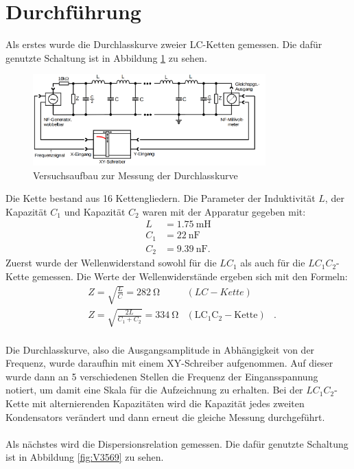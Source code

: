 \documentclass[
  bibliography=totoc,     %
  captions=tableheading,  %
  titlepage=firstiscover, %
]{scrartcl}
\begin{document}
\section{Durchführung}
\label{durchführung}
Als erstes wurde die Durchlasskurve zweier LC-Ketten gemessen. Die dafür
genutzte Schaltung ist in Abbildung \ref{fig:V3568} zu sehen.
\begin{figure}[htb]
  \centering
  \includegraphics[width=0.8\textwidth]{V3568.png}
  \caption{Versuchsaufbau zur Messung der Durchlasskurve }
  \label{fig:V3568}
\end{figure}
Die Kette bestand aus 16 Kettengliedern.
Die Parameter der Induktivität $L$, der Kapazität $C_1$ und Kapazität
$C_2$ waren mit der Apparatur gegeben mit:
\begin{align}
  L &= \SI{1.75}{\milli\henry} \\
  C_1 &= \SI{22}{\nano\farad} \\
  C_2 &= \SI{9.39}{\nano\farad}.
\end{align}
Zuerst wurde der Wellenwiderstand sowohl für die $LC_1$ als auch für die
$LC_1C_2$-Kette gemessen. Die Werte der Wellenwiderstände ergeben sich mit den
Formeln:
\begin{align}
  &Z =\sqrt{\frac{L}{C}}=\SI{282}{\ohm}&(LC-Kette)& \\
  &Z =\sqrt{\frac{2L}{C_1+C_2}}=\SI{334}{\ohm}&\mathup{(LC_1C_2-Kette)}&. \\
\end{align}

Die Durchlasskurve, also die Ausgangsamplitude in Abhängigkeit von der Frequenz,
wurde daraufhin mit einem XY-Schreiber aufgenommen. Auf
dieser wurde dann an 5 verschiedenen Stellen die Frequenz der Eingansspannung
notiert, um damit eine Skala für die Aufzeichnung zu erhalten.
Bei der $LC_1C_2$-Kette mit alternierenden Kapazitäten wird die Kapazität jedes
zweiten Kondensators verändert und dann erneut die gleiche Messung durchgeführt.\\
\\
Als nächstes wird die Dispersionsrelation gemessen. Die dafür genutzte Schaltung
ist in Abbildung \ref{fig:V3569} zu sehen.
\end{document}
